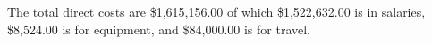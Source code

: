 The total direct costs are \$1,615,156.00 of which \$1,522,632.00 is in salaries, \$8,524.00 is for equipment, and \$84,000.00 is for travel.